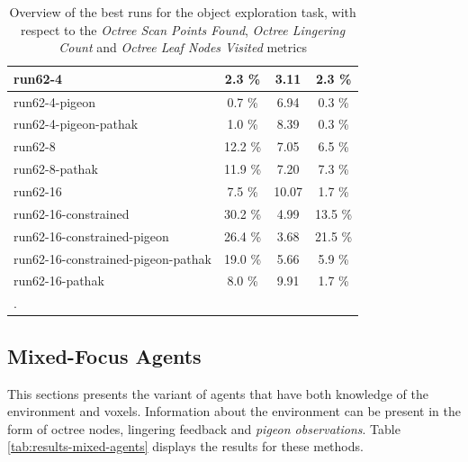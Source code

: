\begin{longtable}{|l|c|c|c|}
    run62-4	&	2.3	\%	&	3.11	&	2.3	\%	\\ \hline
    run62-4-pigeon	&	0.7	\%	&	6.94	&	0.3	\%	\\ \hline
    run62-4-pigeon-pathak	&	1.0	\%	&	8.39	&	0.3	\%	\\ \hline
    run62-8	&	12.2	\%	&	7.05	&	6.5	\%	\\ \hline
    run62-8-pathak	&	11.9	\%	&	7.20	&	7.3	\%	\\ \hline
    run62-16	&	7.5	\%	&	10.07	&	1.7	\%	\\ \hline
    run62-16-constrained	&	30.2	\%	&	4.99	&	13.5	\%	\\ \hline
    run62-16-constrained-pigeon	&	26.4	\%	&	3.68	&	21.5	\%	\\ \hline
    run62-16-constrained-pigeon-pathak	&	19.0	\%	&	5.66	&	5.9	\%	\\ \hline
    run62-16-pathak	&	8.0	\%	&	9.91	&	1.7	\%	\\ \hline
    \caption{Overview of the best runs for the object exploration task, with respect to the \textit{Octree Scan Points Found}, \textit{Octree Lingering Count} and \textit{Octree Leaf Nodes Visited} metrics}. \label{tab:RQ2-results-comparative-voxeloctree}
\end{longtable}


\subsection{Mixed-Focus Agents}
This sections presents the variant of agents that have both knowledge of the environment and voxels. Information about the environment can be present in the form of octree nodes, lingering feedback and \textit{pigeon observations}. Table \ref{tab:results-mixed-agents} displays the results for these methods.


